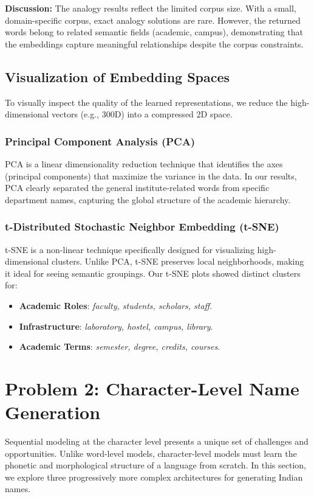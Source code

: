 \documentclass[12pt,a4paper]{article}
\begin{document}
\textbf{Discussion:} The analogy results reflect the limited corpus size. With a small, domain-specific corpus, exact analogy solutions are rare. However, the returned words belong to related semantic fields (academic, campus), demonstrating that the embeddings capture meaningful relationships despite the corpus constraints.


\subsection{Visualization of Embedding Spaces}
To visually inspect the quality of the learned representations, we reduce the high-dimensional vectors (e.g., 300D) into a compressed 2D space.

\subsubsection{Principal Component Analysis (PCA)}
PCA is a linear dimensionality reduction technique that identifies the axes (principal components) that maximize the variance in the data. In our results, PCA clearly separated the general institute-related words from specific department names, capturing the global structure of the academic hierarchy.

\subsubsection{t-Distributed Stochastic Neighbor Embedding (t-SNE)}
t-SNE is a non-linear technique specifically designed for visualizing high-dimensional clusters. Unlike PCA, t-SNE preserves local neighborhoods, making it ideal for seeing semantic groupings. Our t-SNE plots showed distinct clusters for:
\begin{itemize}
    \item \textbf{Academic Roles}: \textit{faculty, students, scholars, staff}.
    \item \textbf{Infrastructure}: \textit{laboratory, hostel, campus, library}.
    \item \textbf{Academic Terms}: \textit{semester, degree, credits, courses}.
\end{itemize}

\newpage
\section{Problem 2: Character-Level Name Generation}
Sequential modeling at the character level presents a unique set of challenges and opportunities. Unlike word-level models, character-level models must learn the phonetic and morphological structure of a language from scratch. In this section, we explore three progressively more complex architectures for generating Indian names.
\end{document}

